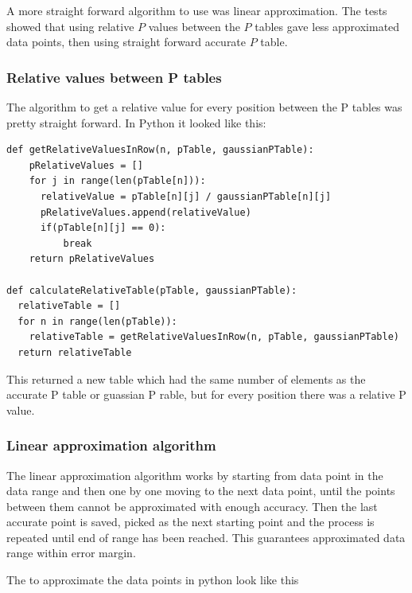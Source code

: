 \documentclass[12pt]{article}
\begin{document}
A more straight forward algorithm to use was linear approximation. The tests showed that using relative $P$ values between the $P$ tables gave less approximated data points, then using straight forward accurate $P$ table.

\subsubsection{Relative values between P tables}

The algorithm to get a relative value for every position between the P tables was pretty straight forward. In Python it looked like this:

\begin{verbatim}
def getRelativeValuesInRow(n, pTable, gaussianPTable):
    pRelativeValues = []
    for j in range(len(pTable[n])):
      relativeValue = pTable[n][j] / gaussianPTable[n][j]
      pRelativeValues.append(relativeValue)
      if(pTable[n][j] == 0):
          break
    return pRelativeValues

def calculateRelativeTable(pTable, gaussianPTable):
  relativeTable = []
  for n in range(len(pTable)):
    relativeTable = getRelativeValuesInRow(n, pTable, gaussianPTable)
  return relativeTable

\end{verbatim}

This returned a new table which had the same number of elements as the accurate P table or guassian P rable, but for every position there was a relative P value.

\subsubsection{Linear approximation algorithm}

The linear approximation algorithm works by starting from data point in the data range and then one by one moving to the next data point, until the points between them cannot be approximated with enough accuracy. Then the last accurate point is saved, picked as the next starting point and the process is repeated until end of range has been reached. This guarantees approximated data range within error margin.

The to approximate the data points in python look like this
\end{document}
